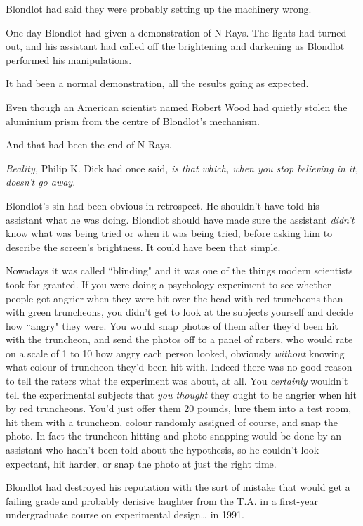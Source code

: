 Blondlot had said they were probably setting up the machinery wrong.

One day Blondlot had given a demonstration of N-Rays. The lights had turned out, and his assistant had called off the brightening and darkening as Blondlot performed his manipulations.

It had been a normal demonstration, all the results going as expected.

Even though an American scientist named Robert Wood had quietly stolen the aluminium prism from the centre of Blondlot's mechanism.

And that had been the end of N-Rays.

\emph{Reality,} Philip K. Dick had once said, \emph{is that which, when you stop believing in it, doesn't go away}.

Blondlot's sin had been obvious in retrospect. He shouldn't have told his assistant what he was doing. Blondlot should have made sure the assistant \emph{didn't} know what was being tried or when it was being tried, before asking him to describe the screen's brightness. It could have been that simple.

Nowadays it was called ``blinding" and it was one of the things modern scientists took for granted. If you were doing a psychology experiment to see whether people got angrier when they were hit over the head with red truncheons than with green truncheons, you didn't get to look at the subjects yourself and decide how ``angry" they were. You would snap photos of them after they'd been hit with the truncheon, and send the photos off to a panel of raters, who would rate on a scale of 1 to 10 how angry each person looked, obviously \emph{without} knowing what colour of truncheon they'd been hit with. Indeed there was no good reason to tell the raters what the experiment was about, at all. You \emph{certainly} wouldn't tell the experimental subjects that \emph{you thought} they ought to be angrier when hit by red truncheons. You'd just offer them 20 pounds, lure them into a test room, hit them with a truncheon, colour randomly assigned of course, and snap the photo. In fact the truncheon-hitting and photo-snapping would be done by an assistant who hadn't been told about the hypothesis, so he couldn't look expectant, hit harder, or snap the photo at just the right time.

Blondlot had destroyed his reputation with the sort of mistake that would get a failing grade and probably derisive laughter from the T.A. in a first-year undergraduate course on experimental design{\ldots} in 1991.

